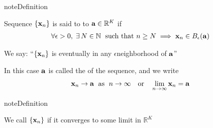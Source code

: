 \documentclass[letterpaper,10pt,english]{jupyterBook}
\begin{document}
\begin{sphinxadmonition}{note}{Definition}

\sphinxAtStartPar
Sequence \(\{{\bf x}_n\}\) is said to  to \({\bf a} \in \mathbb{R}^K\) if
\begin{equation*}
\begin{split}
%
\forall \epsilon > 0, 
\;
\exists \, N \in \mathbb{N}
\; 
\text{ such that } n \geq N \implies {\bf x}_n \in B_{\epsilon}({\bf a})
%
\end{split}
\end{equation*}\end{sphinxadmonition}

\sphinxAtStartPar
We say: “\(\{{\bf x}_n\}\) is eventually in any \(\epsilon\)\sphinxhyphen{}neighborhood of \({\bf a}\)”

\sphinxAtStartPar
In this case \({\bf a}\) is called the  of the sequence, and we write
\begin{equation*}
\begin{split} 
%
{\bf x}_n \to {\bf a} \; \text{ as } \; n \to \infty
\quad \text{or} \quad
\lim_{n \to \infty} {\bf x}_n = {\bf a}
%
\end{split}
\end{equation*}
\begin{sphinxadmonition}{note}{Definition}

\sphinxAtStartPar
We call \(\{ {\bf x}_n \}\)  if it converges to some limit in \(\mathbb{R}^K\)
\end{sphinxadmonition}

\begin{figure}[htbp]
\centering

\noindent{}
\end{figure}

\begin{figure}[htbp]
\centering

\noindent{}
\end{figure}

\begin{figure}[htbp]
\centering

\noindent{}
\end{figure}
\end{document}
